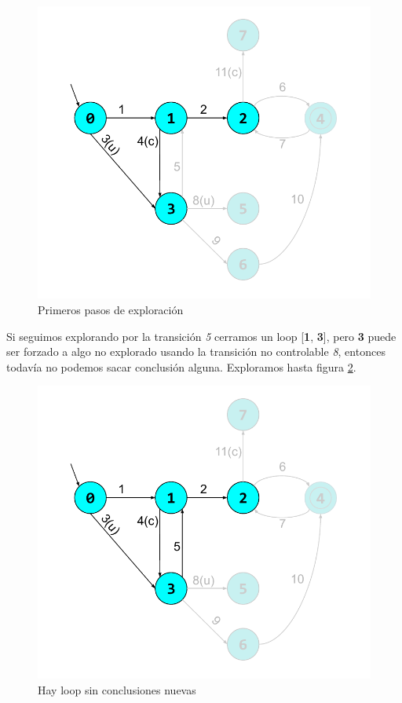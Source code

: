 \begin{figure}[h]
 \centering
 \includegraphics[scale=0.6]{figures/ejemplo_on-the-fly/1.pdf}
 \caption{Primeros pasos de exploración}
 \label{fig:ej:exploracion1}
\end{figure}

Si seguimos explorando por la transición \textit{5} cerramos un loop [\textbf{1}, \textbf{3}], pero \textbf{3} puede ser forzado a algo no explorado usando la transición no controlable \textit{8}, entonces todavía no podemos sacar conclusión alguna. Exploramos hasta figura \ref{fig:ej:exploracion2}.

\begin{figure}
 \centering
 \includegraphics[scale=0.6]{figures/ejemplo_on-the-fly/2.pdf}
 \caption{Hay loop sin conclusiones nuevas}
 \label{fig:ej:exploracion2}
\end{figure}


